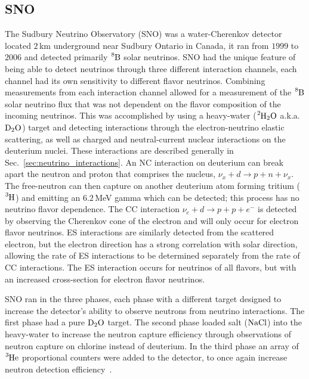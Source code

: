 \subsection{SNO}
\label{sec:sno}
The Sudbury Neutrino Observatory (SNO) was a water-Cherenkov detector located
 $2$\,km underground near Sudbury Ontario in Canada, it ran from
$1999$ to $2006$ and detected primarily $\ce{^{8}B}$ solar neutrinos.
SNO had the unique feature of
being able to detect neutrinos through three different interaction channels,
each channel had its own sensitivity to different flavor neutrinos.
Combining measurements from each interaction channel allowed for a measurement of the $\ce{^{8}B}$
solar neutrino flux that was not dependent on the flavor composition of the
incoming neutrinos.
This was accomplished by using a heavy-water ($\ce{^{2}H_{2}O}$ a.k.a. $\ce{D_{2}O}$) target and
detecting interactions through the electron-neutrino elastic scattering,
as well as charged and neutral-current nuclear interactions on the deuterium
nuclei.
These interactions are described generally in Sec.~\ref{sec:neutrino_interactions}.
An NC interaction on deuterium can break apart the neutron and proton
that comprises the nucleus, $\nu_{x} + d \rightarrow p + n + \nu_{x}$.
The free-neutron can then capture on another deuterium atom forming tritium ($\ce{^{3}H}$)
and emitting an $6.2$\,MeV gamma which can be detected;
this process has no neutrino flavor dependence.
The CC interaction $\nu_{e} + d \rightarrow p + p + e^{-}$
is detected by observing the Cherenkov cone of the electron and will only
occur for electron flavor neutrinos.
ES interactions are similarly detected from the scattered electron,
but the electron direction has a strong correlation with solar direction,
allowing the rate of ES interactions to be determined separately from the
rate of CC interactions.
The ES interaction occurs for neutrinos of all flavors, but with an increased
cross-section for electron flavor neutrinos.

SNO ran in the three phases, each phase with a different target
designed to increase the detector's ability to observe neutrons from neutrino
interactions.
The first phase had a pure $\ce{D_{2}O}$ target.
 The second phase loaded salt ($\ce{NaCl}$) into the heavy-water to increase
the neutron capture efficiency through observations of neutron capture on
chlorine instead of deuterium.
In the third phase an array of $\ce{^{3}He}$ proportional counters were added
to the detector, to once again increase neutron detection efficiency~\citep{sno_review}.

